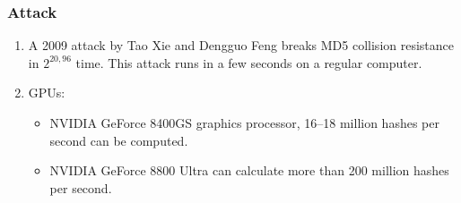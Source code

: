 \documentclass{beamer}
\begin{document}
\begin{frame}
\frametitle{Attack}
\begin{enumerate}
\item A 2009 attack by Tao Xie and Dengguo Feng breaks MD5 collision resistance in $2^{20,96}$ time. This attack runs in a few seconds on a regular computer.
\item GPUs:
\begin{itemize}
\item NVIDIA GeForce 8400GS graphics processor, 16–18 million hashes per second can be computed. 
\item NVIDIA GeForce 8800 Ultra can calculate more than 200 million hashes per second.
\end{itemize}
\end{enumerate}
\end{frame}
\end{document}
